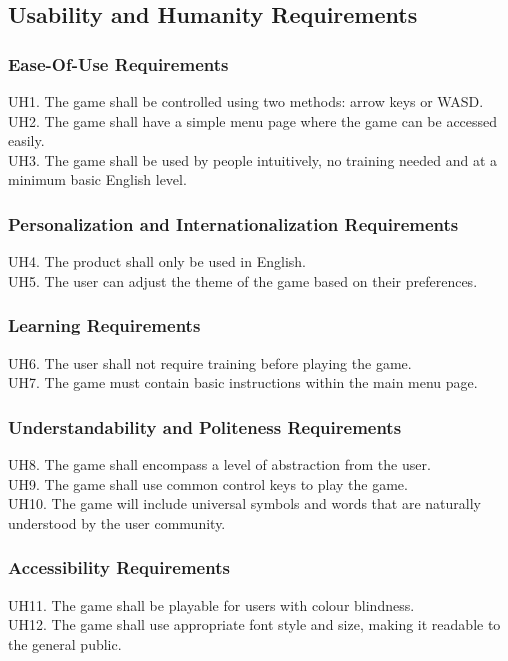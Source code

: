\documentclass[12pt]{article}
\begin{document}
	\subsection{Usability and Humanity Requirements}
	\subsubsection{Ease-Of-Use Requirements}
	UH1. The game shall be controlled using two methods: arrow keys or WASD.\\
	UH2. The game shall have a simple menu page where the game can be accessed easily.\\
	UH3. The game shall be used by people intuitively, no training needed and at a minimum basic English level.
	
	\subsubsection{Personalization and Internationalization Requirements}
	UH4. The product shall only be used in English.\\
	UH5. The user can adjust the theme of the game based on their preferences.
	
	\subsubsection{Learning Requirements}
	UH6. The user shall not require training before playing the game.\\
	UH7. The game must contain basic instructions within the main menu page.
	
	\subsubsection{Understandability and Politeness Requirements}
	UH8. The game shall encompass a level of abstraction from the user.\\
	UH9. The game shall use common control keys to play the game.\\
	UH10. The game will include universal symbols and words that are naturally understood by the user community.
	
	\subsubsection{Accessibility Requirements}
	UH11. The game shall be playable for users with colour blindness.\\
	UH12. The game shall use appropriate font style and size, making it readable to the general public.
	
\end{document}
